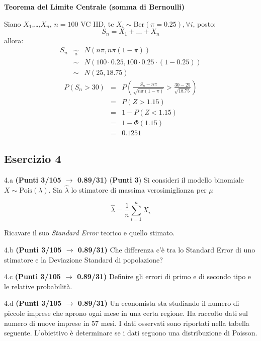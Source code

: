 \documentclass[
  11pt,
]{book}
\theoremstyle{mytheoremstyle}
\theoremstyle{mydefstyle}
\newenvironment{sol}
  {
  \begin{tcolorbox}[enhanced,breakable,arc=0.1mm,boxrule=1pt,colback=white,colframe=iblue,
  title=\bf \fontfamily{lmss}\selectfont \hspace{.5 cm} Soluzione,drop fuzzy shadow]

}{
\end{tcolorbox}
  }
\begin{document}
\begin{sol}
\textbf{Teorema del Limite Centrale (somma di Bernoulli)}

Siano \(X_1\),\ldots,\(X_n\), \(n=100\) VC IID, tc \(X_i\sim\text{Ber}(\pi=0.25)\)\(,\forall i\), posto:
\[
      S_n = X_1 + ... + X_n
      \]
allora:\begin{eqnarray*}
  S_n & \mathop{\sim}\limits_{a}& N(n\pi,n\pi(1-\pi)) \\
      &\sim & N(100\cdot0.25,100\cdot0.25\cdot(1-0.25)) \\
      &\sim & N(25,18.75)
  \end{eqnarray*}\begin{eqnarray*}
      P( S_n   >   30 ) 
        &=& P\left(  \frac { S_n  -  n\pi }{ \sqrt{n\pi(1-\pi)} }  >  \frac { 30  -  25 }{\sqrt{ 18.75 }} \right)  \\
                 &=& P\left(  Z   >   1.15 \right) \\    &=& 1-P(Z< 1.15 )\\ 
                 &=&  1-\Phi( 1.15 ) \\ &=&  0.1251 
      \end{eqnarray*}

\end{sol}

\subsection{Esercizio 4}\label{esercizio-4-39}

4.a \textbf{(Punti 3/105 \(\rightarrow\) 0.89/31)} (\textbf{Punti 3}) Si consideri il modello binomiale \(X\sim\text{Pois}(\lambda)\). Sia \(\hat\lambda\) lo stimatore di massima verosimiglianza per \(\mu\)

\[
  \hat\lambda = \frac 1n \sum_{i=1}^n X_i
\]

Ricavare il suo \emph{Standard Error} teorico e quello stimato.

4.b \textbf{(Punti 3/105 \(\rightarrow\) 0.89/31)} Che differenza c'è tra lo Standard Error di uno stimatore e la Deviazione Standard di popolazione?

4.c \textbf{(Punti 3/105 \(\rightarrow\) 0.89/31)} Definire gli errori di primo e di secondo tipo e le relative probabilità.

4.d \textbf{(Punti 3/105 \(\rightarrow\) 0.89/31)} Un economista sta studiando il numero di piccole imprese che aprono ogni mese in una certa regione. Ha raccolto dati sul numero di nuove imprese in 57 mesi. I dati osservati sono riportati nella tabella seguente. L'obiettivo è determinare se i dati seguono una distribuzione di Poisson.
\end{document}
